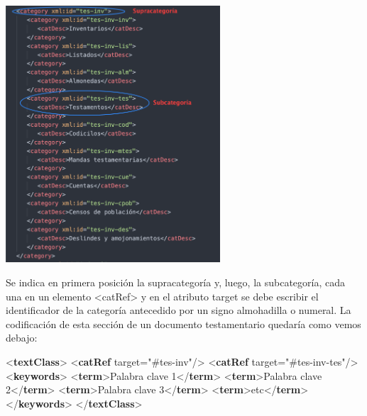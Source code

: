 \documentclass[
]{book}
\newenvironment{Shaded}{\begin{snugshade}}{\end{snugshade}}
\newcommand{\KeywordTok}[1]{\textcolor[rgb]{0.13,0.29,0.53}{\textbf{#1}}}
\newcommand{\NormalTok}[1]{#1}
\newcommand{\OtherTok}[1]{\textcolor[rgb]{0.56,0.35,0.01}{#1}}
\newcommand{\StringTok}[1]{\textcolor[rgb]{0.31,0.60,0.02}{#1}}
\begin{document}
\includegraphics[width=0.6\textwidth,height=\textheight]{img/taxonomia.png}

Se indica en primera posición la supracategoría y, luego, la subcategoría, cada una en un elemento { \textless catRef\textgreater{} } y en el atributo target se debe escribir el identificador de la categoría antecedido por un signo almohadilla o numeral. La codificación de esta sección de un documento testamentario quedaría como vemos debajo:

\begin{Shaded}
\begin{Highlighting}[]
\NormalTok{\textless{}}\KeywordTok{textClass}\NormalTok{\textgreater{} }
\NormalTok{  \textless{}}\KeywordTok{catRef}\OtherTok{ target=}\StringTok{"\#tes{-}inv"}\NormalTok{/\textgreater{}}
\NormalTok{  \textless{}}\KeywordTok{catRef}\OtherTok{ target=}\StringTok{"\#tes{-}inv{-}tes"}\NormalTok{/\textgreater{} }
\NormalTok{  \textless{}}\KeywordTok{keywords}\NormalTok{\textgreater{} }
\NormalTok{    \textless{}}\KeywordTok{term}\NormalTok{\textgreater{}Palabra clave 1\textless{}/}\KeywordTok{term}\NormalTok{\textgreater{}}
\NormalTok{    \textless{}}\KeywordTok{term}\NormalTok{\textgreater{}Palabra clave 2\textless{}/}\KeywordTok{term}\NormalTok{\textgreater{}}
\NormalTok{    \textless{}}\KeywordTok{term}\NormalTok{\textgreater{}Palabra clave 3\textless{}/}\KeywordTok{term}\NormalTok{\textgreater{}}
\NormalTok{    \textless{}}\KeywordTok{term}\NormalTok{\textgreater{}etc\textless{}/}\KeywordTok{term}\NormalTok{\textgreater{}}
\NormalTok{  \textless{}/}\KeywordTok{keywords}\NormalTok{\textgreater{}}
\NormalTok{\textless{}/}\KeywordTok{textClass}\NormalTok{\textgreater{}}
\end{Highlighting}
\end{Shaded}
\end{document}
